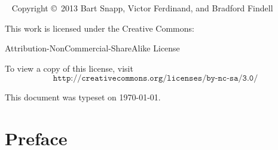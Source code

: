 

\newpage

\begin{fullwidth}
~\vfill
\thispagestyle{empty}
\setlength{\parindent}{0pt}
\setlength{\parskip}{\baselineskip}
Copyright \copyright~2013 Bart Snapp, Victor Ferdinand, and Bradford Findell

\vspace{.5cm}

\noindent
This work is licensed under the Creative Commons:
\begin{center}
Attribution-NonCommercial-ShareAlike License 
\end{center}
To view a copy of this license, visit
\[
\texttt{http://creativecommons.org/licenses/by-nc-sa/3.0/}
\]


\vspace{.5cm}
\noindent This document was typeset on \today.
\end{fullwidth}



\chapter*{Preface}


